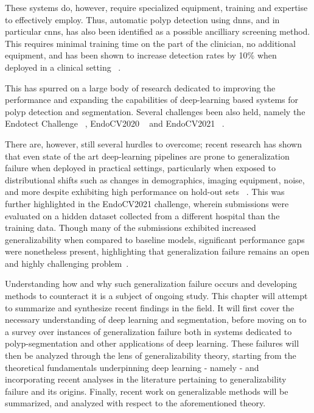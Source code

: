 These systems do, however, require specialized equipment, training and expertise to effectively employ. Thus, automatic polyp detection using \glspl{dnn}, and in particular \glspl{cnn}, has also been identified as a possible ancilliary screening method. This requires minimal training time on the part of the clinician, no additional equipment, and has been shown to increase detection rates by 10\% when deployed in a clinical setting ~\cite{polyp-success-story}. 

This has spurred on a large body of research dedicated to improving the performance and expanding the capabilities of deep-learning based systems for polyp detection and segmentation. Several challenges been also held, namely the Endotect Challenge ~\cite{endotect}, EndoCV2020 ~\cite{endocv2020} and EndoCV2021 ~\cite{endocv2021}.

There are, however, still several hurdles to overcome; recent research has shown that even state of the art deep-learning pipelines are prone to generalization failure when deployed in practical settings, particularly when exposed to distributional shifts such as changes in demographics, imaging equipment, noise, and more despite exhibiting high performance on hold-out sets ~\cite{retinopathy, damour2020underspecification, pneumonia, shortcut_learning}. This was further highlighted in the EndoCV2021 challenge, wherein submissions were evaluated on a hidden dataset collected from a different hospital than the training data. Though many of the submissions exhibited increased generalizability when compared to baseline models, significant performance gaps were nonetheless present, highlighting that generalization failure remains an open and highly challenging problem~\cite{endocv2021}. 

Understanding how and why such generalization failure occurs and developing methods to counteract it is a subject of ongoing study. This chapter will attempt to summarize and synthesize recent findings in the field. It will first cover the necessary understanding of deep learning and segmentation, before moving on to a survey over instances of generalization failure both in systems dedicated to polyp-segmentation and other applications of deep learning. These failures will then be analyzed through the lens of generalizability theory, starting from the theoretical fundamentals underpinning deep learning - namely  - and incorporating recent analyses in the literature pertaining to generalizability failure and its origins. Finally, recent work on generalizable methods will be summarized, and analyzed with respect to the aforementioned theory. 
	
